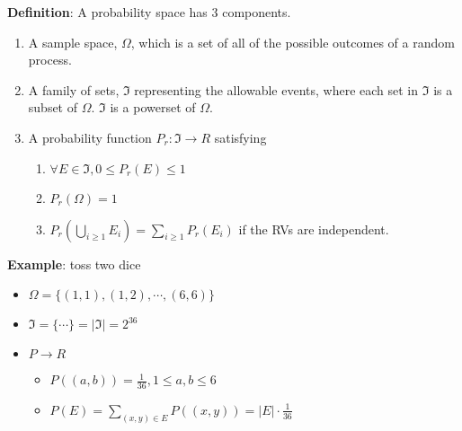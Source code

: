 \documentclass[12pt]{article}
\begin{document}
\textbf{Definition}: A probability space has 3 components.
\begin{enumerate}[noitemsep]
\item A sample space, $\Omega$, which is a set of all of the possible outcomes of a random process.
\item A family of sets, $\Im$ representing the allowable events, where each set in $\Im$ is a subset of $\Omega$. $\Im$ is a powerset of $\Omega$.
\item A probability function $P_r: \Im \rightarrow R$ satisfying
\begin{enumerate}[noitemsep]
\item $\forall E \in \Im, 0 \le P_r(E) \le 1$
\item $P_r(\Omega) = 1$
\item $P_r(\bigcup\limits_{i \ge 1} E_{i}) = \sum\limits_{i \ge 1}P_r(E_i)$ if the RVs are independent.
\end{enumerate}
\end{enumerate}

\textbf{Example}: toss two dice

\begin{itemize}
\item $\Omega = \{(1, 1), (1, 2), \cdots, (6, 6)\}$
\item $\Im = \{\cdots\} = |\Im| = 2^{36}$
\item $P \rightarrow R$
\begin{itemize}
\item $P((a, b)) = \frac{1}{36}, 1 \le a, b \le 6$
\item $P(E) = \sum \limits_{(x, y) \in E} P((x, y)) = |E| \cdot \frac{1}{36}$
\end{itemize}
\end{itemize}
\end{document}
